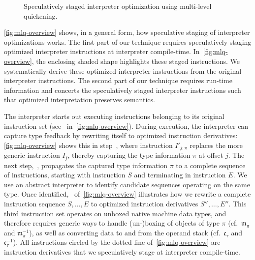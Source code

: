 \documentclass[preprint,10pt]{popl14conf}
\begin{document}
\begin{figure}[t!]
  \caption{Speculatively staged interpreter optimization using multi-level quickening.}
  \label{fig:mlq-overview}
\end{figure}


\autoref{fig:mlq-overview} shows, in a general form, how speculative staging of interpreter
optimizations works.
The first part of our technique requires speculatively staging optimized interpreter instructions at
interpreter compile-time.
In~\autoref{fig:mlq-overview}, the enclosing shaded shape highlights these staged instructions.
We systematically derive these optimized interpreter instructions from the original interpreter
instructions.
The second part of our technique requires run-time information and concerts the speculatively staged
interpreter instructions such that optimized interpretation preserves semantics.

The interpreter starts out executing instructions belonging to its original instruction set
(see~ in~\autoref{fig:mlq-overview}).
During execution, the interpreter can capture type feedback by rewriting itself to optimized
instruction derivatives:
\autoref{fig:mlq-overview} shows this in step~, where instruction $I'_{j:\pi}$
replaces the more generic instruction $I_{j}$, thereby capturing the type information $\pi$ at
offset $j$.
The next step,~,  propagates the captured type information $\pi$ to a complete
sequence of instructions, starting with instruction $S$ and terminating in instruction $E$.
We use an abstract interpreter to identify candidate sequences operating on the same type.
Once identified,~ of~\autoref{fig:mlq-overview} illustrates how we rewrite a
complete instruction sequence $S,\ldots, E$ to optimized instruction derivatives $S'',\dots,E''$.
This third instruction set operates on unboxed native machine data types, and therefore requires
generic ways to handle (un-)boxing of objects of type $\pi$ (cf.~$\mathfrak{m}_{\pi}$ and
$\mathfrak{m}_{\pi}^{-1}$), as well as converting data to and from the operand stack
(cf.~$\mathfrak{c}_{\tau}$ and $\mathfrak{c}_{\tau}^{-1}$).
All instructions circled by the dotted line of~\autoref{fig:mlq-overview} are instruction
derivatives that we speculatively stage at interpreter compile-time.
\end{document}
